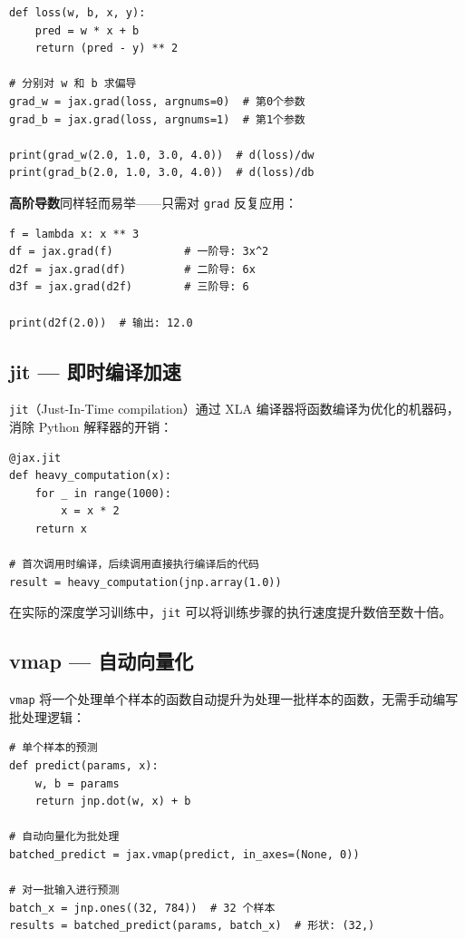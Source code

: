 \documentclass[12pt,a4paper]{article}
\begin{document}
\begin{lstlisting}
def loss(w, b, x, y):
    pred = w * x + b
    return (pred - y) ** 2

# 分别对 w 和 b 求偏导
grad_w = jax.grad(loss, argnums=0)  # 第0个参数
grad_b = jax.grad(loss, argnums=1)  # 第1个参数

print(grad_w(2.0, 1.0, 3.0, 4.0))  # d(loss)/dw
print(grad_b(2.0, 1.0, 3.0, 4.0))  # d(loss)/db
\end{lstlisting}

\textbf{高阶导数}同样轻而易举——只需对 \texttt{grad} 反复应用：

\begin{lstlisting}
f = lambda x: x ** 3
df = jax.grad(f)           # 一阶导: 3x^2
d2f = jax.grad(df)         # 二阶导: 6x
d3f = jax.grad(d2f)        # 三阶导: 6

print(d2f(2.0))  # 输出: 12.0
\end{lstlisting}

\subsection{jit --- 即时编译加速}

\texttt{jit}（Just-In-Time compilation）通过 XLA 编译器将函数编译为优化的机器码，消除 Python 解释器的开销：

\begin{lstlisting}
@jax.jit
def heavy_computation(x):
    for _ in range(1000):
        x = x * 2
    return x

# 首次调用时编译，后续调用直接执行编译后的代码
result = heavy_computation(jnp.array(1.0))
\end{lstlisting}

在实际的深度学习训练中，\texttt{jit} 可以将训练步骤的执行速度提升数倍至数十倍。

\subsection{vmap --- 自动向量化}

\texttt{vmap} 将一个处理单个样本的函数自动提升为处理一批样本的函数，无需手动编写批处理逻辑：

\begin{lstlisting}
# 单个样本的预测
def predict(params, x):
    w, b = params
    return jnp.dot(w, x) + b

# 自动向量化为批处理
batched_predict = jax.vmap(predict, in_axes=(None, 0))

# 对一批输入进行预测
batch_x = jnp.ones((32, 784))  # 32 个样本
results = batched_predict(params, batch_x)  # 形状: (32,)
\end{lstlisting}
\end{document}
